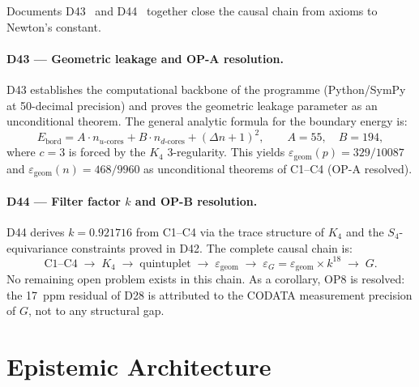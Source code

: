 \documentclass[11pt,a4paper]{article}
\theoremstyle{plain}
\theoremstyle{definition}
\theoremstyle{remark}
\begin{document}
Documents D43~\cite{D43} and D44~\cite{D44} together close the causal chain from axioms to Newton's constant.

\paragraph{D43 --- Geometric leakage and OP-A resolution.} D43 establishes the computational backbone of the programme (Python/SymPy at 50-decimal precision) and proves the geometric leakage parameter as an unconditional theorem. The general analytic formula for the boundary energy is:
\begin{equation}
E_{\mathrm{bord}} = A \cdot n_{u\text{-cores}} + B \cdot n_{d\text{-cores}} + (\Delta n+1)^2, \qquad A = 55,\quad B = 194,
\end{equation}
where $c=3$ is forced by the $K_4$ 3-regularity. This yields $\varepsilon_{\mathrm{geom}}(p) = 329/10087$ and $\varepsilon_{\mathrm{geom}}(n) = 468/9960$ as unconditional theorems of C1--C4 (OP-A resolved).

\paragraph{D44 --- Filter factor $k$ and OP-B resolution.} D44 derives $k = 0.921716$ from C1--C4 via the trace structure of $K_4$ and the $S_4$-equivariance constraints proved in D42. The complete causal chain is:
\begin{equation*}
\text{C1--C4} \;\to\; K_4 \;\to\; \text{quintuplet} \;\to\; \varepsilon_{\mathrm{geom}} \;\to\; \varepsilon_G = \varepsilon_{\mathrm{geom}} \times k^{18} \;\to\; G.
\end{equation*}
No remaining open problem exists in this chain. As a corollary, OP8 is resolved: the 17~ppm residual of D28 is attributed to the CODATA measurement precision of $G$, not to any structural gap.

\section{Epistemic Architecture}
\label{sec:epistemic}
\end{document}
